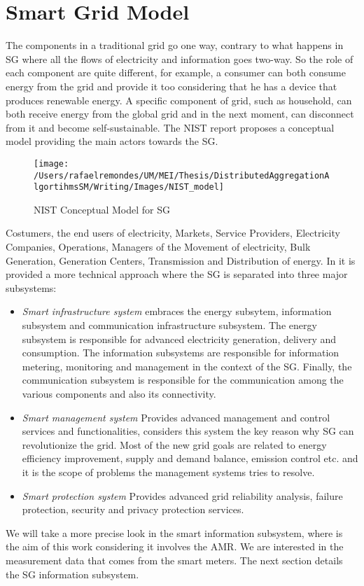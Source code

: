 \section{Smart Grid Model}
 The components in a traditional grid go one way, contrary to what happens in SG where all the flows of electricity and information goes two-way.  So the role of each component are quite different, for example, a consumer can both consume energy from the grid and provide it too considering that he has a device that produces renewable energy. A specific component of grid, such as household, can both receive energy from the global grid and in the next moment, can disconnect from it and become self-sustainable. The NIST report \cite{government2011nist} proposes a conceptual model providing the main actors towards the SG.
\begin{figure}[h]
\centering
\texttt{[image: /Users/rafaelremondes/UM/MEI/Thesis/DistributedAggregationAlgortihmsSM/Writing/Images/NIST\_model]}
\caption{\label{fig:NIST_model} NIST Conceptual Model for SG}
\end{figure}
Costumers, the end users of electricity, Markets, Service Providers, Electricity Companies, Operations, Managers of the Movement of electricity, Bulk Generation, Generation Centers, Transmission and Distribution of energy. 
In \cite{journals/comsur/FangMXY12} it is provided a more technical approach where the SG is separated into three major subsystems:
\begin{itemize}
\item \textit{Smart infrastructure system} embraces the energy subsytem, information subsystem and communication infrastructure subsystem. The energy subsystem is responsible for advanced electricity generation, delivery and consumption. The information subsystems are responsible for information metering, monitoring and management in the context of the SG. Finally, the communication subsystem is responsible for the communication among the various components and also its connectivity.   
\item \textit{Smart management system} Provides advanced management and control services and functionalities, \cite{journals/comsur/FangMXY12} considers this system the key reason why SG can revolutionize the grid.  Most of the new grid goals are related to energy efficiency improvement, supply and demand balance, emission control etc. and it is the scope of problems the management systems tries to resolve.
\item \textit{Smart protection system} Provides advanced grid reliability analysis, failure protection, security and privacy protection services.
 \end{itemize}
We will take a more precise look in the smart information subsystem, where is the aim of this work considering it involves the AMR. We are interested in the measurement data that comes from the smart meters. The next section details the SG information subsystem.

